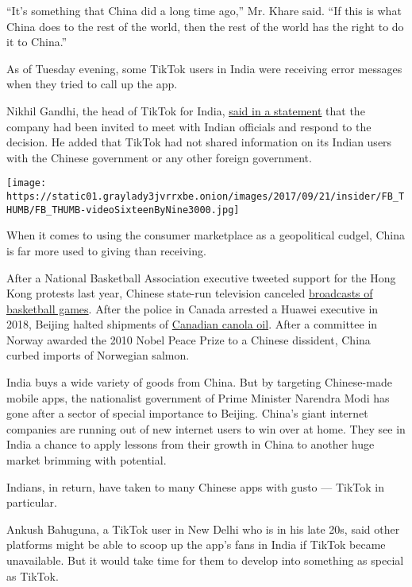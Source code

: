 ``It's something that China did a long time ago,'' Mr. Khare said. ``If
this is what China does to the rest of the world, then the rest of the
world has the right to do it to China.''

As of Tuesday evening, some TikTok users in India were receiving error
messages when they tried to call up the app.

Nikhil Gandhi, the head of TikTok for India,
\href{https://twitter.com/TikTok_IN/status/1277811841364668416}{said in
a statement} that the company had been invited to meet with Indian
officials and respond to the decision. He added that TikTok had not
shared information on its Indian users with the Chinese government or
any other foreign government.

\texttt{[image: https://static01.graylady3jvrrxbe.onion/images/2017/09/21/insider/FB\_THUMB/FB\_THUMB-videoSixteenByNine3000.jpg]}

When it comes to using the consumer marketplace as a geopolitical
cudgel, China is far more used to giving than receiving.

After a National Basketball Association executive tweeted support for
the Hong Kong protests last year, Chinese state-run television canceled
\href{https://www.nytimes3xbfgragh.onion/2020/02/14/sports/nba-china-hong-kong-protests.html}{broadcasts
of basketball games}. After the police in Canada arrested a Huawei
executive in 2018, Beijing halted shipments of
\href{https://www.nytimes3xbfgragh.onion/2019/05/16/world/asia/china-canadian-arrested.html}{Canadian
canola oil}. After a committee in Norway awarded the 2010 Nobel Peace
Prize to a Chinese dissident, China curbed imports of Norwegian salmon.

India buys a wide variety of goods from China. But by targeting
Chinese-made mobile apps, the nationalist government of Prime Minister
Narendra Modi has gone after a sector of special importance to Beijing.
China's giant internet companies are running out of new internet users
to win over at home. They see in India a chance to apply lessons from
their growth in China to another huge market brimming with potential.

Indians, in return, have taken to many Chinese apps with gusto ---
TikTok in particular.

Ankush Bahuguna, a TikTok user in New Delhi who is in his late 20s, said
other platforms might be able to scoop up the app's fans in India if
TikTok became unavailable. But it would take time for them to develop
into something as special as TikTok.

